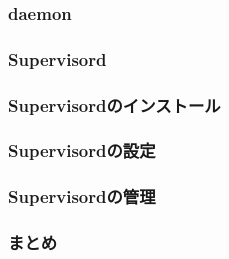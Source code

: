 
\subsubsection{daemon}

\subsubsection{Supervisord}

\subsubsection{Supervisordのインストール}

\subsubsection{Supervisordの設定}

\subsubsection{Supervisordの管理}

\subsubsection{まとめ}

